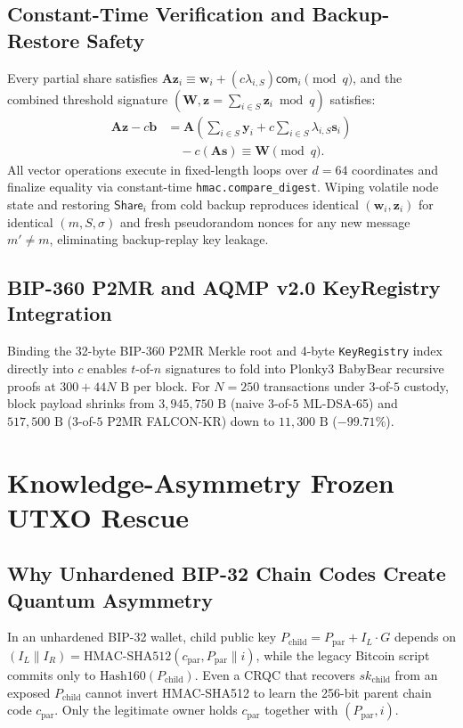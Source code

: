 \documentclass[conference,compsoc]{IEEEtran}
\begin{document}
\subsection{Constant-Time Verification and Backup-Restore Safety}
Every partial share satisfies $\mathbf{A}\mathbf{z}_i \equiv \mathbf{w}_i + (c\lambda_{i,S})\mathsf{com}_i \pmod q$, and the combined threshold signature $(\mathbf{W}, \mathbf{z} = \sum_{i \in S}\mathbf{z}_i \bmod q)$ satisfies:
\begin{equation}
\begin{aligned}
\mathbf{A}\mathbf{z} - c\mathbf{b}
  &= \mathbf{A}\!\left(\sum_{i \in S}\mathbf{y}_i + c\sum_{i \in S}\lambda_{i,S}\mathbf{s}_i\right) \\
  &\quad - c(\mathbf{A}\mathbf{s}) \equiv \mathbf{W} \pmod q.
\end{aligned}
\end{equation}
All vector operations execute in fixed-length loops over $d = 64$ coordinates and finalize equality via constant-time \texttt{hmac.compare\_\allowbreak digest}. Wiping volatile node state and restoring $\mathsf{Share}_i$ from cold backup reproduces identical $(\mathbf{w}_i, \mathbf{z}_i)$ for identical $(m, S, \sigma)$ and fresh pseudorandom nonces for any new message $m' \ne m$, eliminating backup-replay key leakage.

\subsection{BIP-360 P2MR and AQMP v2.0 KeyRegistry Integration}
Binding the 32-byte BIP-360 P2MR Merkle root and 4-byte \texttt{KeyRegistry} index directly into $c$ enables $t$-of-$n$ signatures to fold into Plonky3 BabyBear recursive proofs at $300 + 44N\text{ B}$ per block. For $N = 250$ transactions under $3$-of-$5$ custody, block payload shrinks from $3{,}945{,}750\text{ B}$ (naive $3$-of-$5$ ML-DSA-65) and $517{,}500\text{ B}$ ($3$-of-$5$ P2MR FALCON-KR) down to $11{,}300\text{ B}$ ($-99.71\%$).

\section{Knowledge-Asymmetry Frozen UTXO Rescue}
\label{sec:rescue}

\subsection{Why Unhardened BIP-32 Chain Codes Create Quantum Asymmetry}
In an unhardened BIP-32 wallet, child public key $P_{\text{child}} = P_{\text{par}} + I_L \cdot G$ depends on $(I_L \parallel I_R) = \mathrm{HMAC\text{-}SHA512}(c_{\text{par}}, P_{\text{par}} \parallel i)$, while the legacy Bitcoin script commits only to $\mathrm{Hash160}(P_{\text{child}})$. Even a CRQC that recovers $sk_{\text{child}}$ from an exposed $P_{\text{child}}$ cannot invert HMAC-SHA512 to learn the 256-bit parent chain code $c_{\text{par}}$. Only the legitimate owner holds $c_{\text{par}}$ together with $(P_{\text{par}}, i)$.
\end{document}
